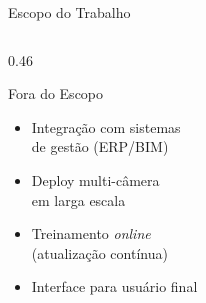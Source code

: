 \begin{frame}{Escopo do Trabalho}
\begin{columns}[T]
\begin{column}{0.46\textwidth}
{\begin{block}{\centering Fora do Escopo}
\begin{itemize}
          \item[\color{skipcolor}$\boldsymbol{\times}$] Integra\c{c}\~{a}o com sistemas\\de gest\~{a}o (ERP/BIM)
          \item[\color{skipcolor}$\boldsymbol{\times}$] Deploy multi-c\^{a}mera\\em larga escala
          \item[\color{skipcolor}$\boldsymbol{\times}$] Treinamento \textit{online}\\(atualiza\c{c}\~{a}o cont\'{i}nua)
          \item[\color{skipcolor}$\boldsymbol{\times}$] Interface para usu\'{a}rio final
        \end{itemize}
        \medskip
      \end{block}
      }
    \end{column}
  \end{columns}
  \vfill
\end{frame}
